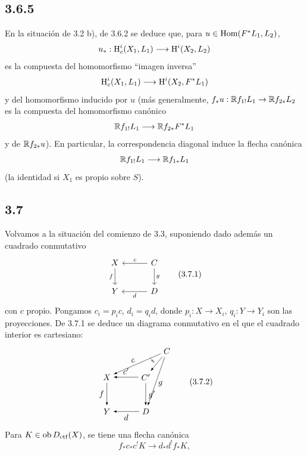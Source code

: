 \subsection*{3.6.5}
En la situación de 3.2 b), de 3.6.2 se deduce que, para $u\in\operatorname{Hom}(F^*L_1,L_2)$,
\[
u_*:\mathrm{H}_c^i(X_1,L_1)\longrightarrow \mathrm{H}^i(X_2,L_2)
\]
es la compuesta del homomorfismo ``imagen inversa''
\[
\mathrm{H}_c^i(X_1,L_1)\longrightarrow \mathrm{H}^i(X_2,F^*L_1)
\]
y del homomorfismo inducido por $u$ (más generalmente, $f_*u:\mathbb{R} f_{1!}L_1\to \mathbb{R} f_{2*}L_2$ es la compuesta del homomorfismo canónico
\[
\mathbb{R} f_{1!}L_1\longrightarrow \mathbb{R} f_{2*}F^*L_1
\]
y de $\mathbb{R} f_{2*}u$). En particular, la correspondencia diagonal induce la flecha canónica
\[
\mathbb{R} f_{1!}L_1\longrightarrow \mathbb{R} f_{1*}L_1
\]
(la identidad si $X_1$ es propio sobre $S$).

\subsection*{3.7}
Volvamos a la situación del comienzo de 3.3, suponiendo dado además un cuadrado conmutativo
\begin{equation}
\begin{tikzcd}[column sep=3em,row sep=2em]
X \arrow[d,"f"'] & C \arrow[l,"c"'] \arrow[d,"g"] \\
Y & D \arrow[l,"d"]
\end{tikzcd}
\tag{3.7.1}
\end{equation}
con $c$ propio. Pongamos $c_i=p_ic$, $d_i=q_id$, donde $p_i:X\to X_i$, $q_i:Y\to Y_i$ son las proyecciones. De 3.7.1 se deduce un diagrama conmutativo en el que el cuadrado interior es cartesiano:
\begin{equation}
\begin{tikzpicture}[>=latex,baseline=(current bounding box.center),scale=1]
\node (X) at (0,0) {$X$};
\node (Y) at (0,-1.45) {$Y$};
\node (Cp) at (1.65,0) {$C'$};
\node (D) at (1.65,-1.45) {$D$};
\node (C) at (2.55,1.1) {$C$};
\draw[->] (C) -- node[above,sloped,pos=.55] {$c$} (X);
\draw[->] (C) -- node[above,sloped,pos=.50] {$i$} (Cp);
\draw[->] (C) -- node[right,pos=.55] {$g$} (D);
\draw[->] (Cp) -- node[above] {$c'$} (X);
\draw[->] (Cp) -- node[right] {$g'$} (D);
\draw[->] (X) -- node[left] {$f$} (Y);
\draw[->] (D) -- node[below] {$d$} (Y);
\end{tikzpicture}
\tag{3.7.2}
\end{equation}
Para $K\in\operatorname{ob}D_{\mathrm{ctf}}(X)$, se tiene una flecha canónica
\begin{equation}
f_*c_*c^!K\longrightarrow d_*d^!f_*K,
\tag{3.7.3}
\end{equation}
